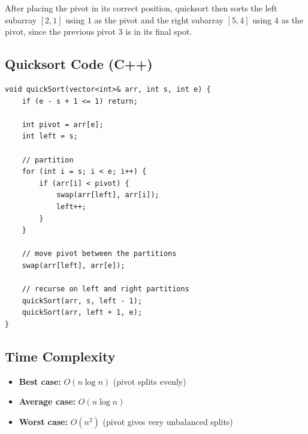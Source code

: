\documentclass{article}
\begin{document}








After placing the pivot in its correct position, quicksort then sorts the left subarray $[2,1]$ using $1$ as the pivot and the right subarray $[5, 4]$ using $4$ as the pivot, since the previous pivot $3$ is in its final spot. 
\subsection{Quicksort Code (C++)}
\begin{verbatim}
void quickSort(vector<int>& arr, int s, int e) {
    if (e - s + 1 <= 1) return;

    int pivot = arr[e];
    int left = s;

    // partition
    for (int i = s; i < e; i++) {
        if (arr[i] < pivot) {
            swap(arr[left], arr[i]);
            left++;
        }
    }

    // move pivot between the partitions
    swap(arr[left], arr[e]);

    // recurse on left and right partitions
    quickSort(arr, s, left - 1);
    quickSort(arr, left + 1, e);
}
\end{verbatim}

\subsection{Time Complexity}
\begin{itemize}
  \item \textbf{Best case:} $O(n\log n)$ (pivot splits evenly)
  \item \textbf{Average case:} $O(n\log n)$
  \item \textbf{Worst case:} $O(n^2)$ (pivot gives very unbalanced splits)
\end{itemize}
\end{document}
